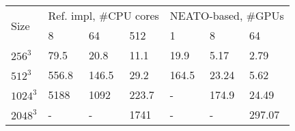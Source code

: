 \centering
\begin{tabular}{|l|l|l|l|l|l|l|}
\hline
\multirow{2}{*}{Size} & \multicolumn{3}{c|}{Ref. impl, \#CPU cores} & \multicolumn{3}{c|}{NEATO-based, \#GPUs} \\ \cline{2-7}
         & 8         & 64        & 512      & 1       & 8       & 64      \\ \hline
$256^3$  & 79.5      & 20.8      & 11.1     & 19.9    & 5.17    & 2.79    \\ \hline
$512^3$  & 556.8     & 146.5     & 29.2     & 164.5   & 23.24   & 5.62    \\ \hline
$1024^3$ & 5188      & 1092      & 223.7    & -       & 174.9   & 24.49   \\ \hline
$2048^3$ & -         & -         & 1741     & -       & -       & 297.07  \\ \hline
\end{tabular}
